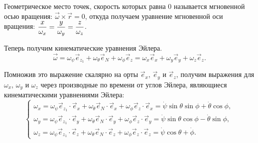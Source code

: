 Геометрическое место точек, скорость которых равна 0 называется мгновенной осью
вращения: \( \vec{\omega}\times\vec{r} = 0 \), откуда получаем уравнение
мгновенной оси вращения: \( \displaystyle \frac{x}{\omega_x} = \frac{y}{\omega_y} =
\frac{z}{\omega_z} \).

Теперь получим кинематические уравнения Эйлера.
\[
    \vec{\omega} = \omega_\psi\vec{e}_{z_1} + \omega_\theta\vec{e}_N +
    \omega_\phi\vec{e}_z = \omega_x\vec{e}_x + \omega_y\vec{e}_y +
    \omega_z\vec{e}_z.
\]

Помножив это выражение скалярно на орты \( \vec{e}_x \), \( \vec{e}_y \) и \( \vec{e}_z \),
получим выражения для \( \omega_x \), \( \omega_y \) и \( \omega_z \) через
производные по времени от углов Эйлера, являющиеся кинематическими уравнениями Эйлера:
\[
    \left\{ \begin{array}{l}
        \omega_x = \omega_\psi\vec{e}_{z_1}\cdot\vec{e}_x +
        \omega_\theta\vec{e}_N\cdot\vec{e}_x +\omega_\phi\vec{e}_z\cdot\vec{e}_x
        = \dot{\psi}\sin\theta\sin\phi + \dot{\theta}\cos\phi, \\
        \omega_y = \omega_\psi\vec{e}_{z_1}\cdot\vec{e}_y +
        \omega_\theta\vec{e}_N\cdot\vec{e}_y +\omega_\phi\vec{e}_z\cdot\vec{e}_y
        = \dot{\psi}\sin\theta\cos\phi - \dot{\theta}\sin\phi, \\
        \omega_z = \omega_\psi\vec{e}_{z_1}\cdot\vec{e}_z +
        \omega_\theta\vec{e}_N\cdot\vec{e}_z +\omega_\phi\vec{e}_z\cdot\vec{e}_z
        = \dot{\psi}\cos\theta + \dot\phi.
    \end{array} \right.
\]

\newpage